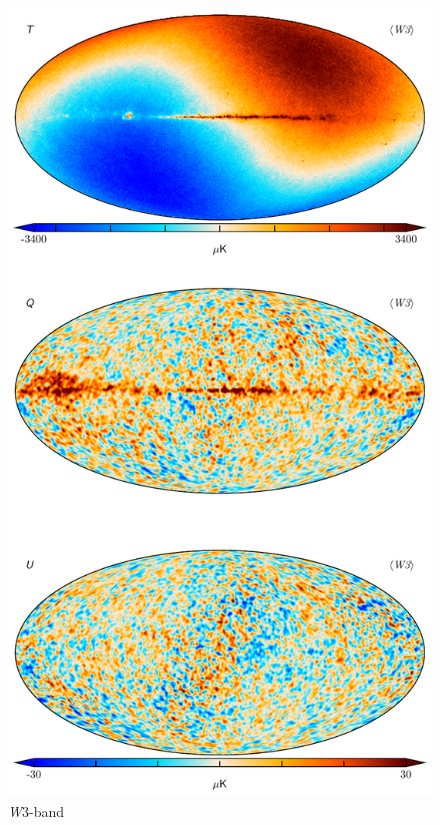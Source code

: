 \documentclass[twocolumn]{../../common/aa}
\newcommand{\W}[0]{\textit W}
\begin{document}
\begin{figure}
	\centering
	\includegraphics[height=0.9\textheight]{figures/090-WMAP_W3_map.pdf}
	\caption{\W3-band}
\end{figure}
\end{document}
